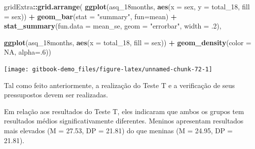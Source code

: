 \documentclass[
]{book}
\newenvironment{Shaded}{\begin{snugshade}}{\end{snugshade}}
\newcommand{\DataTypeTok}[1]{\textcolor[rgb]{0.13,0.29,0.53}{#1}}
\newcommand{\DecValTok}[1]{\textcolor[rgb]{0.00,0.00,0.81}{#1}}
\newcommand{\FloatTok}[1]{\textcolor[rgb]{0.00,0.00,0.81}{#1}}
\newcommand{\KeywordTok}[1]{\textcolor[rgb]{0.13,0.29,0.53}{\textbf{#1}}}
\newcommand{\NormalTok}[1]{#1}
\newcommand{\OperatorTok}[1]{\textcolor[rgb]{0.81,0.36,0.00}{\textbf{#1}}}
\newcommand{\OtherTok}[1]{\textcolor[rgb]{0.56,0.35,0.01}{#1}}
\newcommand{\StringTok}[1]{\textcolor[rgb]{0.31,0.60,0.02}{#1}}
\begin{document}
\begin{Shaded}
\begin{Highlighting}[]
\NormalTok{gridExtra}\OperatorTok{::}\KeywordTok{grid.arrange}\NormalTok{(}
  \KeywordTok{ggplot}\NormalTok{(asq_18months, }\KeywordTok{aes}\NormalTok{(}\DataTypeTok{x =}\NormalTok{ sex, }\DataTypeTok{y =}\NormalTok{ total_}\DecValTok{18}\NormalTok{, }\DataTypeTok{fill =}\NormalTok{ sex)) }\OperatorTok{+}
\StringTok{  }\KeywordTok{geom_bar}\NormalTok{(}\DataTypeTok{stat =} \StringTok{"summary"}\NormalTok{, }\DataTypeTok{fun=}\NormalTok{mean) }\OperatorTok{+}
\StringTok{  }\KeywordTok{stat_summary}\NormalTok{(}\DataTypeTok{fun.data =}\NormalTok{ mean_se, }\DataTypeTok{geom =} \StringTok{"errorbar"}\NormalTok{, }\DataTypeTok{width =} \FloatTok{.2}\NormalTok{),}

  \KeywordTok{ggplot}\NormalTok{(asq_18months, }\KeywordTok{aes}\NormalTok{(}\DataTypeTok{x =}\NormalTok{ total_}\DecValTok{18}\NormalTok{, }\DataTypeTok{fill =}\NormalTok{ sex)) }\OperatorTok{+}\StringTok{ }
\StringTok{  }\KeywordTok{geom_density}\NormalTok{(}\DataTypeTok{color =} \OtherTok{NA}\NormalTok{, }\DataTypeTok{alpha=}\NormalTok{.}\DecValTok{6}\NormalTok{))}
\end{Highlighting}
\end{Shaded}

\begin{center}\texttt{[image: gitbook-demo\_files/figure-latex/unnamed-chunk-72-1]} \end{center}

Tal como feito anteriormente, a realização do Teste T e a verificação de seus pressupostos devem ser realizadas.

Em relação aos resultados do Teste T, eles indicaram que ambos os grupos tem resultados médios significativamente diferentes. Meninos apresentam resultados mais elevados (M = 27.53, DP = 21.81) do que meninas (M = 24.95, DP = 21.81).

\begin{Shaded}
\end{Shaded}
\end{document}
